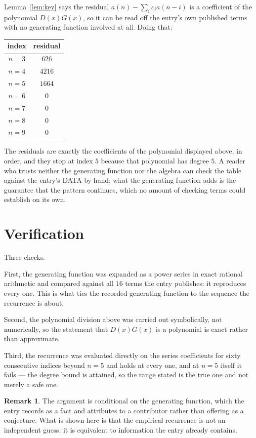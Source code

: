 \documentclass[11pt,a4paper]{article}
\theoremstyle{plain}
\theoremstyle{definition}
\newtheorem{remark}[theorem]{Remark}
\begin{document}
Lemma~\ref{lem:key} says the residual $a(n)-\sum_ic_ia(n-i)$ is a coefficient of the
polynomial $D(x)G(x)$, so it can be read off the entry's own published terms with no
generating function involved at all. Doing that:
\begin{center}
\begin{tabular}{cc}
index & residual \\ \hline
$n=3$ & $626$ \\
$n=4$ & $4216$ \\
$n=5$ & $1664$ \\
$n=6$ & $0$ \\
$n=7$ & $0$ \\
$n=8$ & $0$ \\
$n=9$ & $0$
\end{tabular}
\end{center}
The residuals are exactly the coefficients of the polynomial displayed above, in order, and
they stop at index $5$ because that polynomial has degree $5$. A reader who trusts
neither the generating function nor the algebra can check the table against the entry's DATA
by hand; what the generating function adds is the guarantee that the pattern continues, which
no amount of checking terms could establish on its own.

\section{Verification}

Three checks.

First, the generating function was expanded as a power series in exact rational arithmetic and
compared against all $16$ terms the entry publishes: it reproduces every one. This is
what ties the recorded generating function to the sequence the recurrence is about.

Second, the polynomial division above was carried out symbolically, not numerically, so the
statement that $D(x)G(x)$ is a polynomial is exact rather than approximate.

Third, the recurrence was evaluated directly on the series coefficients for sixty consecutive
indices beyond $n=5$ and holds at every one, and at $n=5$ itself it fails --- the
degree bound is attained, so the range stated is the true one and not merely a safe one.

\begin{remark}
The argument is conditional on the generating function, which the entry records as a fact and
attributes to a contributor rather than offering as a conjecture. What is shown here is that
the empirical recurrence is not an independent guess: it is equivalent to information the
entry already contains.
\end{remark}
\end{document}
